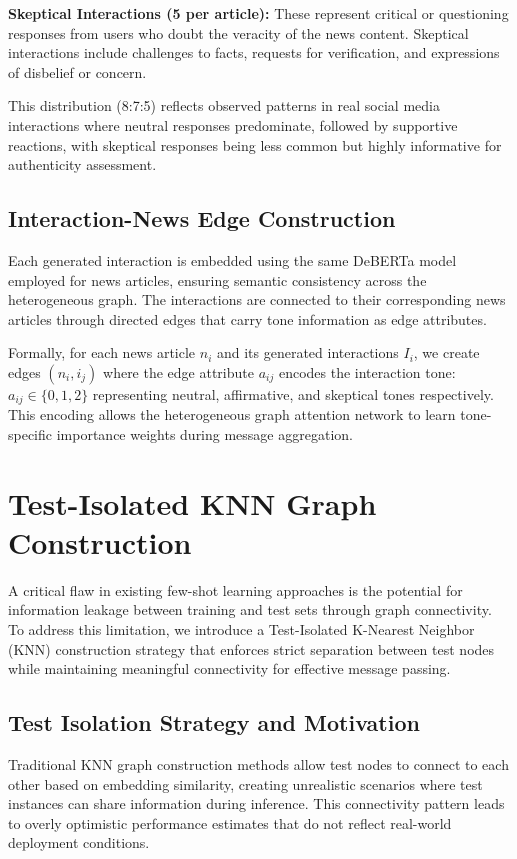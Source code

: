 \textbf{Skeptical Interactions (5 per article):} These represent critical or questioning responses from users who doubt the veracity of the news content. Skeptical interactions include challenges to facts, requests for verification, and expressions of disbelief or concern.

This distribution (8:7:5) reflects observed patterns in real social media interactions where neutral responses predominate, followed by supportive reactions, with skeptical responses being less common but highly informative for authenticity assessment.

\subsection{Interaction-News Edge Construction}

Each generated interaction is embedded using the same DeBERTa model employed for news articles, ensuring semantic consistency across the heterogeneous graph. The interactions are connected to their corresponding news articles through directed edges that carry tone information as edge attributes.

Formally, for each news article $n_i$ and its generated interactions $I_i$, we create edges $(n_i, i_j)$ where the edge attribute $a_{ij}$ encodes the interaction tone: $a_{ij} \in \{0, 1, 2\}$ representing neutral, affirmative, and skeptical tones respectively. This encoding allows the heterogeneous graph attention network to learn tone-specific importance weights during message aggregation.

\section{Test-Isolated KNN Graph Construction}

A critical flaw in existing few-shot learning approaches is the potential for information leakage between training and test sets through graph connectivity. To address this limitation, we introduce a Test-Isolated K-Nearest Neighbor (KNN) construction strategy that enforces strict separation between test nodes while maintaining meaningful connectivity for effective message passing.

\subsection{Test Isolation Strategy and Motivation}

Traditional KNN graph construction methods allow test nodes to connect to each other based on embedding similarity, creating unrealistic scenarios where test instances can share information during inference. This connectivity pattern leads to overly optimistic performance estimates that do not reflect real-world deployment conditions.

